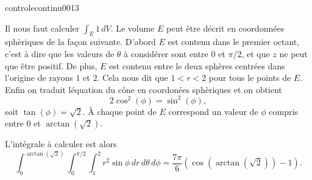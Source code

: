 \begin{corrige}{controlecontinu0013}

Il nous faut calculer $\int_{E}1\,dV$. Le volume $E$ peut être décrit en coordonnées sphèriques de la façon suivante. D'abord $E$ est contenu dans le premier octant, c'est à dire que les valeurs de $\theta$ à considérer sont entre $0$ et $\pi/2$, et que $z$ ne peut que être positif. De plus, $E$ est contenu entre le deux sphères centrées dans l'origine de rayons $1$ et $2$. Cela nous dit que $1<r<2$ pour tous le points de $E$. Enfin on traduit léquation du cône en coordonées sphèriques et on obtient
\[
2\cos^2(\phi)= \sin^2(\phi),
\]
soit $\tan(\phi)=\sqrt{2}$. À chaque point de $E$ correspond un valeur de $\phi$ compris entre $0$ et $\arctan(\sqrt{2})$. 

L'intégrale à calculer est alors 
\[
\int_0^{\arctan(\sqrt{2})}\int_0^{\pi/2}\int_{1}^{2} r^2\sin{\phi}\, dr\, d\theta\, d\phi = \frac{7\pi}{6}(\cos(\arctan(\sqrt{2}))-1). 
\]

\end{corrige}
